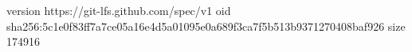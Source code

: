 version https://git-lfs.github.com/spec/v1
oid sha256:5c1e0f83ff7a7ce05a16e4d5a01095e0a689f3ca7f5b513b9371270408baf926
size 174916
